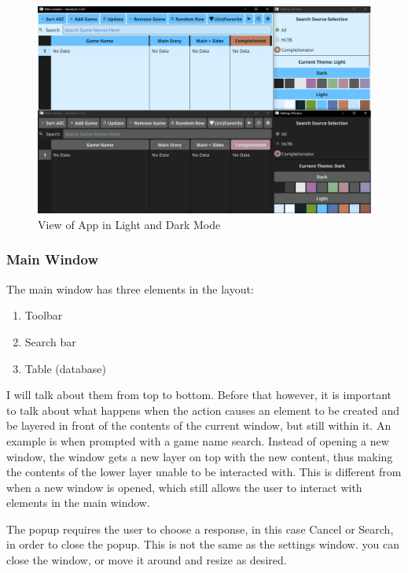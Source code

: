 \begin{figure}[htbp]
	\centering
	\includegraphics[width=14cm]{./Images/AppLD}
	\caption{View of App in Light and Dark Mode}
	\label{fig:AppLD}
\end{figure}

\subsubsection{Main Window}

The main window has three elements in the layout:
\begin{enumerate}
	\item Toolbar
	\item Search bar
	\item Table (database)
\end{enumerate}

I will talk about them from top to bottom.
Before that however, it is important to talk about what happens when
the action causes an element to be created and be layered in front of
the contents of the current window, but still within it. An example is when
prompted with a game name search. Instead of opening a new window, the
window gets a new layer on top with the new content, thus making the
contents of the lower layer unable to be interacted with. This is
different from when a new window is opened, which still allows the
user to interact with elements in the main window.

The popup requires the user to choose a response, in this case Cancel
or Search, in order to close the popup. This is not the same as the
settings window. you can close the window, or move it around and
resize as desired.

